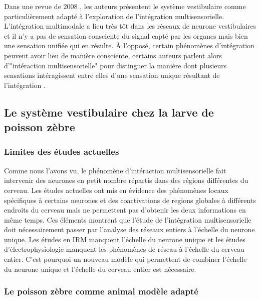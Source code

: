 Dans une revue de 2008 \cite{angelaki_vestibular_2008}, les auteurs présentent le système vestibulaire comme particulièrement adapté à l'exploration de l'intégration multisensorielle. L'intégration multimodale a lieu très tôt dans les réseaux de neurone vestibulaires et il n'y a pas de sensation consciente du signal capté par les organes mais bien une sensation unifiée qui en résulte.
À l'opposé, certain phénomènes d'intégration peuvent avoir lieu de manière consciente, certains auteurs parlent alors d'"intéraction multisensorielle" pour distinguer la manière dont plusieurs sensations intéragissent entre elles d'une sensation unique résultant de l'intégration \cite{driver_multisensory_2008}. 


\subsection{Le système vestibulaire chez la larve de poisson zèbre}

\subsubsection{Limites des études actuelles}

Comme nous l'avons vu, le phénomène d'intéraction multisensorielle fait intervenir des neurones en petit nombre répartis dans des régions différentes du cerveau. Les études actuelles ont mis en évidence des phénomènes locaux spécifiques à certains neurones et des coactivations de regions globales à différents endroits du cerveau mais ne permettent pas d'obtenir les deux informations en même temps. 
Ces éléments montrent que l'étude de l'intégration multisensorielle doit nécessairement passer par l'analyse des réseaux entiers à l'échelle du neurone unique. Les études en IRM manquent l'échelle du neurone unique et les études d'électrophysiologie manquent les phénomènes de réseau à l'échelle du cerveau entier. C'est pourquoi un nouveau modèle qui permettent de combiner l'échelle du neurone unique et l'échelle du cerveau entier est nécessaire.

\subsubsection{Le poisson zèbre comme animal modèle adapté}

